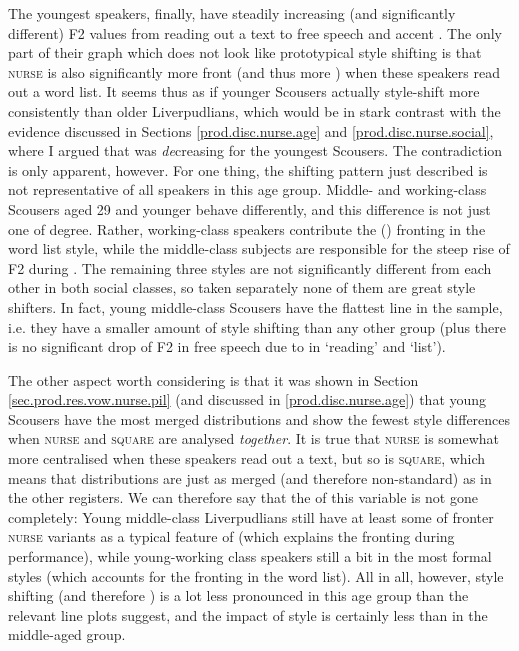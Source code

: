 The youngest speakers, finally, have steadily increasing (and significantly different) F2 values from reading out a text to free speech and accent .
The only part of their graph which does not look like prototypical style shifting is that \textsc{nurse} is also significantly more front (and thus more ) when these speakers read out a word list.
It seems thus as if younger Scousers actually style-shift more consistently than older Liverpudlians, which would be in stark contrast with the evidence discussed in Sections \ref{prod.disc.nurse.age} and \ref{prod.disc.nurse.social}, where I argued that  was \emph{de}creasing for the youngest Scousers.
The contradiction is only apparent, however.
For one thing, the shifting pattern just described is not representative of all speakers in this age group.
Middle- and working-class Scousers aged 29 and younger behave differently, and this difference is not just one of degree.
Rather, working-class speakers contribute the () fronting in the word list style, while the middle-class subjects are responsible for the steep rise of F2 during .
The remaining three styles are not significantly different from each other in both social classes, so taken separately none of them are great style shifters.
In fact, young middle-class Scousers have the flattest line in the sample, i.e. they have a smaller amount of style shifting than any other group (plus there is no significant drop of F2 in free speech due to  in `reading' and `list').

The other aspect worth considering is that it was shown in Section \ref{sec.prod.res.vow.nurse.pil} (and discussed in \ref{prod.disc.nurse.age}) that young Scousers have the most merged distributions and show the fewest style differences when \textsc{nurse} and \textsc{square} are analysed \emph{together}.
It is true that \textsc{nurse} is somewhat more centralised when these speakers read out a text, but so is \textsc{square}, which means that  distributions are just as merged (and therefore non-standard) as in the other registers.
We can therefore say that the  of this variable is not gone completely:
Young middle-class Liverpudlians still have at least some  of fronter \textsc{nurse} variants as a typical feature of  (which explains the fronting during performance), while young-working class speakers still  a bit in the most formal styles (which accounts for the fronting in the word list).
All in all, however, style shifting (and therefore ) is a lot less pronounced in this age group than the relevant line plots suggest, and the impact of style is certainly less than in the middle-aged group.

